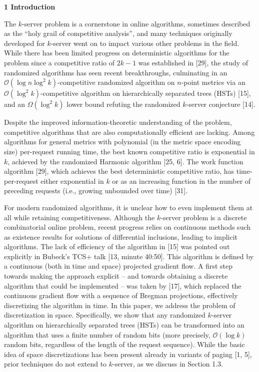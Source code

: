 

\par\medskip\noindent\textbf{
1 Introduction}\par




The $k$-server problem is a cornerstone in online algorithms, sometimes described as the “holy grail of competitive analysis”, and many techniques originally developed for $k$-server went on to impact various other problems in the field. While there has been limited progress on deterministic algorithms for the problem since a competitive ratio of $2k-1$ was established in [29], the study of randomized algorithms has seen recent breakthroughs, culminating in an $\mathcal{O}(\log n\log^{2}k)$-competitive randomized algorithm on $n$-point metrics via an $\mathcal{O}(\log^{2}k)$-competitive algorithm on hierarchically separated trees (HSTs) [15], and an $\Omega(\log^{2}k)$ lower bound refuting the randomized $k$-server conjecture [14].\par




Despite the improved information-theoretic understanding of the problem, competitive algorithms that are also computationally efficient are lacking. Among algorithms for general metrics with polynomial (in the metric space encoding size) per-request running time, the best known competitive ratio is exponential in $k$, achieved by the randomized Harmonic algorithm [25, 6]. The work function algorithm [29], which achieves the best deterministic competitive ratio, has time-per-request either exponential in $k$ or as an increasing function in the number of preceding requests (i.e., growing unbounded over time) [31].\par




For modern randomized algorithms, it is unclear how to even implement them at all while retaining competitiveness. Although the $k$-server problem is a discrete combinatorial online problem, recent progress relies on continuous methods such as existence results for solutions of differential inclusions, leading to implicit algorithms. The lack of efficiency of the algorithm in [15] was pointed out explicitly in Bubeck’s TCS+ talk [13, minute 40:50]. This algorithm is defined by a continuous (both in time and space) projected gradient flow. A first step towards making the approach explicit – and towards obtaining a discrete algorithm that could be implemented – was taken by [17], which replaced the continuous gradient flow with a sequence of Bregman projections, effectively discretizing the algorithm in time. In this paper, we address the problem of discretization in space.
Specifically, we show that any randomized $k$-server algorithm on hierarchically separated trees (HSTs) can be transformed into an algorithm that uses a finite number of random bits (more precisely, $\mathcal{O}(\log k)$ random bits, regardless of the length of the request sequence). While the basic idea of space discretizations has been present already in variants of paging [1, 5], prior techniques do not extend to $k$-server, as we discuss in Section 1.3.\par




